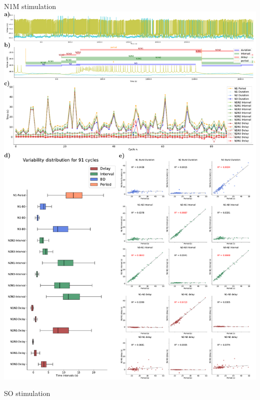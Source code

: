 \documentclass[aspectratio=43]{beamer}
\begin{document}
\begin{frame}{N1M stimulation}
	\includegraphics[width=\textwidth]{invariants/data/SUSSEX/prep2/images/3phases/panel_with_intervals.pdf}
	
\end{frame}


\begin{frame}{SO stimulation}
\end{frame}
\end{document}
